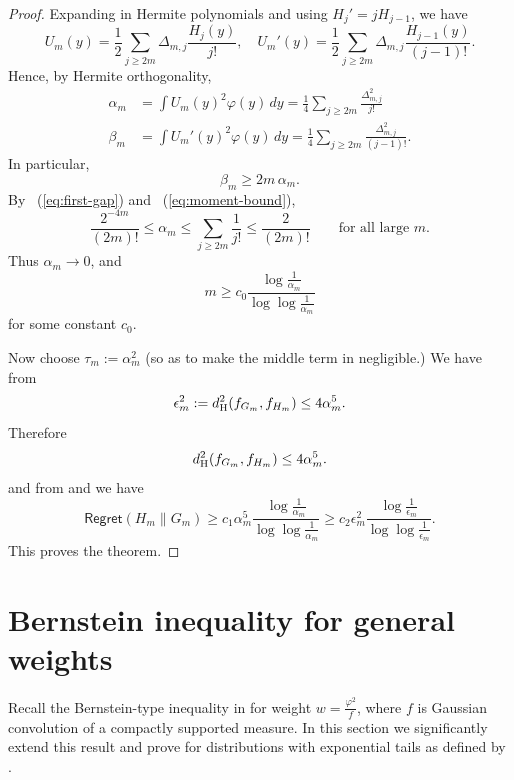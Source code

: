 \documentclass[letterpaper,11pt]{article}
\newcommand{\eqref}[1]{~(\ref{#1})}
\newcommand{\hellinger}{d_{\rm H}}
\theoremstyle{definition}
\newcommand{\Regret}{\mathsf{Regret}}
\begin{document}
\begin{proof}
  Expanding in Hermite polynomials and using $H_j'=j H_{j-1}$, we have
  \[
    U_m(y)
    =
    \frac12\sum_{j\ge 2m}\Delta_{m,j}\frac{H_j(y)}{j!},
    \quad
    U_m'(y)
    =
    \frac12\sum_{j\ge 2m}\Delta_{m,j}\frac{H_{j-1}(y)}{(j-1)!}.
  \]
  Hence, by Hermite orthogonality,
  \begin{align*}
          \alpha_m&=\int U_m(y)^2\varphi(y)\,dy
    =
    \frac14\sum_{j\ge 2m}\frac{\Delta_{m,j}^2}{j!}\\
    \beta_m&=\int U_m'(y)^2\varphi(y)\,dy
    =
    \frac14\sum_{j\ge 2m}\frac{\Delta_{m,j}^2}{(j-1)!}.  \end{align*}
  In particular,
  \begin{equation}
    \beta_m\ge 2m\,\alpha_m.
    \label{eq:beta-lb}
  \end{equation}
  By \eqref{eq:first-gap} and \eqref{eq:moment-bound},
  \begin{equation}
    \frac{2^{-4m}}{(2m)!}
    \le
    \alpha_m
    \le
    \sum_{j\ge 2m}\frac{1}{j!}
    \le
    \frac{2}{(2m)!}
    \qquad \text{for all large }m.
    \label{eq:alpha-bounds}
  \end{equation}
  Thus $\alpha_m\to 0$, and
  \[
  m \geq c_0 \frac{\log \frac{1}{\alpha_m}}{\log\log \frac{1}{\alpha_m}}
    \]
    for some constant $c_0$.

  Now choose $\tau_m:=\alpha_m^2$ (so as to make the middle term in  negligible.)
  We have from 
  \[
   \epsilon_m^2 := \hellinger^2(f_{G_m},f_{H_m})
    \leq
    4 \alpha_m^5.
  \]
  Therefore
  \begin{equation}
    \hellinger^2(f_{G_m},f_{H_m})\le 4\alpha_m^5.
    \label{eq:H-upper}
  \end{equation}
and from  and  we have
\[
\Regret(H_m\|G_m)
\geq c_1
\alpha_m^5
 \frac{\log \frac{1}{\alpha_m}}{\log\log \frac{1}{\alpha_m}}
 \geq c_2 \epsilon_m^2
 \frac{\log \frac{1}{\epsilon_m}}{\log\log \frac{1}{\epsilon_m}}.
\]
  This proves the theorem.
\end{proof}


    \section{Bernstein inequality for general weights}

\label{app:bernstein}
Recall the  Bernstein-type inequality in 
 for weight $w = \frac{\varphi^2}{f}$, where $f$ is 
Gaussian convolution of a compactly supported measure.
In this section
we significantly extend this result and prove  for distributions with exponential tails as defined by .
 
\end{document}
